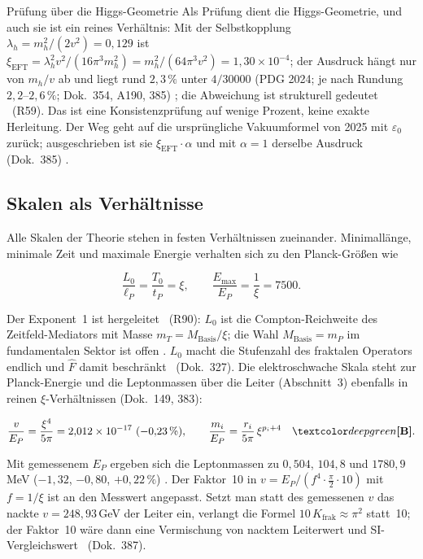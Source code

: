 \begin{ffkasten}{Prüfung über die Higgs-Geometrie}
Als Prüfung dient die Higgs-Geometrie, und auch sie ist ein reines Verhältnis: Mit der
Selbstkopplung $\lambda_h=m_h^2/(2v^2)=0{,}129$ ist
$\xi_{\text{EFT}}=\lambda_h^2v^2/(16\pi^3m_h^2)=m_h^2/(64\pi^3v^2)=1{,}30\times10^{-4}$; der
Ausdruck hängt nur von $m_h/v$ ab und liegt rund $2{,}3\,\%$ unter $4/30000$ (PDG 2024; je nach
Rundung $2{,}2$--$2{,}6\,\%$; Dok.~354, A190, 385) \KM; die Abweichung ist strukturell gedeutet
\SM\ (R59). Das ist eine Konsistenzprüfung auf wenige Prozent, keine exakte Herleitung. Der Weg
geht auf die ursprüngliche Vakuumformel von 2025 mit $\varepsilon_0$ zurück; ausgeschrieben ist sie
$\xi_{\text{EFT}}\cdot\alpha$ und mit $\alpha=1$ derselbe Ausdruck (Dok.~385) \BM.
\end{ffkasten}

\subsection{Skalen als Verhältnisse}

Alle Skalen der Theorie stehen in festen Verhältnissen zueinander. Minimallänge, minimale Zeit und
maximale Energie verhalten sich zu den Planck-Größen wie
\begin{ffkern}
\begin{equation}
  \frac{L_0}{\ell_P}=\frac{T_0}{t_P}=\xi,\qquad \frac{E_{\max}}{E_P}=\frac1\xi=7500 .
\end{equation}
\end{ffkern}%
Der Exponent~1 ist hergeleitet \BM\ (R90): $L_0$ ist die Compton-Reichweite des
Zeitfeld-Mediators mit Masse $m_T=M_{\text{Basis}}/\xi$; die Wahl $M_{\text{Basis}}=m_P$ im
fundamentalen Sektor ist offen \SM. $L_0$ macht die Stufenzahl des fraktalen Operators endlich und
$\hat F$ damit beschränkt \BM\ (Dok.~327). Die elektroschwache Skala steht zur Planck-Energie
und die Leptonmassen über die Leiter (Abschnitt~3) ebenfalls in reinen $\xi$-Verhältnissen
(Dok.~149, 383):
\begin{ffkern}
\begin{equation}
  \frac{v}{E_P}=\frac{\xi^4}{5\pi}=2{,}012\times10^{-17}\ (-0{,}23\,\%),\qquad
  \frac{m_i}{E_P}=\frac{r_i}{5\pi}\,\xi^{p_i+4}\quad\BM .
\end{equation}
\end{ffkern}%
Mit gemessenem $E_P$ ergeben sich die Leptonmassen zu $0{,}504$, $104{,}8$ und $1780{,}9$\,MeV
($-1{,}32$, $-0{,}80$, $+0{,}22\,\%$) \KM. Der Faktor~10 in
$v=E_P/(f^4\cdot\tfrac{\pi}{2}\cdot10)$ mit $f=1/\xi$ ist an den Messwert angepasst. Setzt man statt des
gemessenen $v$ das nackte $v=248{,}93$\,GeV der Leiter ein, verlangt die Formel $10\,K_{\text{frak}}\approx\pi^2$
statt~10; der Faktor~10 wäre dann eine Vermischung von nacktem Leiterwert und SI-Vergleichswert
\SM\ (Dok.~387).


